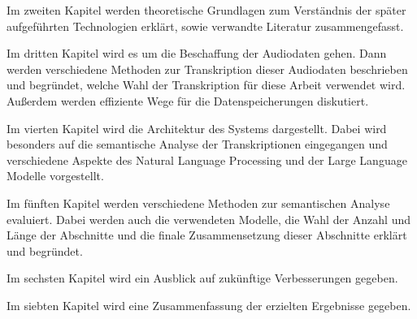 Im zweiten Kapitel werden theoretische Grundlagen zum Verständnis der später aufgeführten Technologien erklärt, sowie verwandte Literatur zusammengefasst.

Im dritten Kapitel wird es um die Beschaffung der Audiodaten gehen. 
Dann werden verschiedene Methoden zur Transkription dieser Audiodaten beschrieben und begründet, welche Wahl der Transkription für diese Arbeit verwendet wird.
Außerdem werden effiziente Wege für die Datenspeicherungen diskutiert.

Im vierten Kapitel wird die Architektur des Systems dargestellt. 
Dabei wird besonders auf die semantische Analyse der Transkriptionen eingegangen und verschiedene Aspekte des Natural Language Processing und der Large Language Modelle vorgestellt.

Im fünften Kapitel werden verschiedene Methoden zur semantischen Analyse evaluiert.
Dabei werden auch die verwendeten Modelle, die Wahl der Anzahl und Länge der Abschnitte und die finale Zusammensetzung dieser Abschnitte erklärt und begründet.

Im sechsten Kapitel wird ein Ausblick auf zukünftige Verbesserungen gegeben.

Im siebten Kapitel wird eine Zusammenfassung der erzielten Ergebnisse gegeben.
